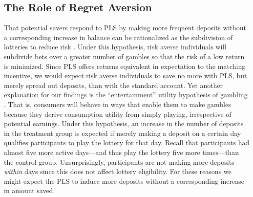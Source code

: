 \documentclass[11pt]{article}
\begin{document}


	\subsection{The Role of Regret Aversion} \label{sec:mechanisms}

		That potential savers respond to PLS by making more frequent deposits without a corresponding increase in balance can be rationalized as the subdivision of lotteries to reduce risk \parencite{samuelson_risk_1963}. Under this hypothesis, risk averse individuals will subdivide bets over a greater number of gambles so that the risk of a low return is minimized. Since PLS offers returns equivalent in expectation to the matching incentive, we would expect risk averse individuals to save no more with PLS, but merely spread out deposits, than with the standard account. Yet another explanation for our findings is the ``entertainment'' utility hypothesis of gambling \parencite{conlisk_utility_1993}. That is, consumers will behave in ways that enable them to make gambles because they derive consumption utility from simply playing, irrespective of potential earnings. Under this hypothesis, an increase in the number of deposits in the treatment group is expected if merely making a deposit on a certain day qualifies participants to play the lottery for that day. Recall that participants had almost five more active days---and thus play the lottery five more times---than the control group. Unsurprisingly, participants are not making more deposits \emph{within} days since this does not affect lottery eligibility. For these reasons we might expect the PLS to induce more deposits without a corresponding increase in amount saved.
\end{document}
